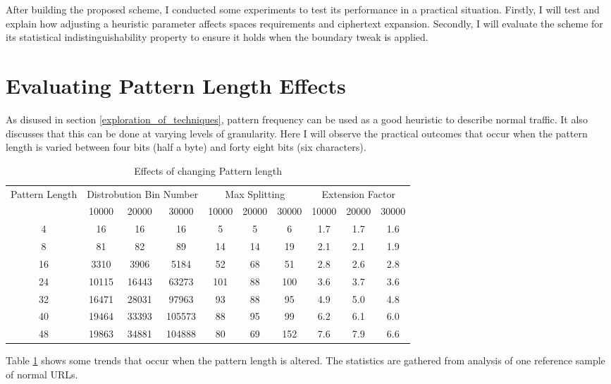 \documentclass[ %
                    author={Samuel Russell},
                supervisor={Prof. Bogdan Warinschi},
                    degree={MEng},
                     title={Innocuous Ciphertexts},
                  subtitle={The DE-CENSOR Scheme},
                      type={research},
                      year={2018} ]{dissertation}
\begin{document}
After building the proposed scheme, I conducted some experiments to test its performance in a practical situation.
Firstly, I will test and explain how adjusting a heuristic parameter affects spaces requirements and ciphertext expansion.
Secondly, I will evaluate the scheme for its statistical indistinguishability property to ensure it holds when the boundary tweak is applied.

\section{Evaluating Pattern Length Effects}\label{sec:gran}

As disused in section \ref{exploration_of_techniques}, pattern frequency can be used as a good heuristic to describe normal traffic.
It also discusses that this can be done at varying levels of granularity.
Here I will observe the practical outcomes that occur when the pattern length is varied between four bits (half a byte) and forty eight bits (six characters).

\begin{table}[h]
\centering
\begin{tabular}{|c|c|c|c|c|c|c|c|c|c|}
\hline
\multirow{2}{*}{Pattern Length}&
\multicolumn{3}{|c|}{Distrobution Bin Number}&
\multicolumn{3}{|c|}{Max Splitting}&
\multicolumn{3}{|c|}{Extension Factor}\\
\cline{2-10}
&10000&20000&30000&10000&20000&30000&10000&20000&30000\\
\hline
4 	& 16&16&16 				& 5&5&6 		& 1.7&1.7&1.6\\
8 	& 81&82&89 				& 14&14&19		& 2.1&2.1&1.9\\
16 	& 3310&3906&5184 		& 52&68&51 		& 2.8&2.6&2.8\\
24 	& 10115&16443&63273 	& 101&88&100 	& 3.6&3.7&3.6\\
32 	& 16471&28031&97963 	& 93&88&95 		& 4.9&5.0&4.8\\
40 	& 19464&33393&105573 	& 88&95&99 		& 6.2&6.1&6.0\\
48 	& 19863&34881&104888 	& 80&69&152 	& 7.6&7.9&6.6\\
\hline
\end{tabular}
\caption{Effects of changing Pattern length}
\label{tab:patlen}
\end{table}

Table \ref{tab:patlen} shows some trends that occur when the pattern length is altered. The statistics are gathered from analysis of one reference sample of normal URLs.
\end{document}
